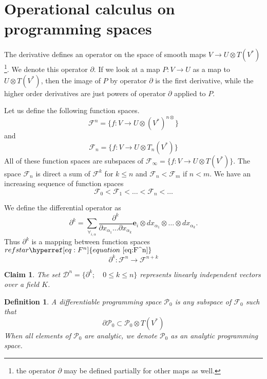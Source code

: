 \documentclass{article}
\makeatletter
\newcommand{\e}{\mathbf{e}}
\newcommand{\F}{\mathcal{F}}
\newcommand{\dP}{\mathcal{P}}
\newcommand{\D}{\partial}
\newcommand{\DD}{\mathcal{D}}
\newtheorem{definicija}{Definition}[section]
\newtheorem{trditev}{Claim}[section]
\let\originaleqref\eqref %
\renewcommand{\eqref}[1]{%
  \begingroup%
  \let\ref\@refstar%
  \hyperref[#1]{%
    equation%
    ~\originaleqref{#1}%
  }%
  \endgroup
}
\makeatother
\begin{document}
\section{Operational calculus on programming spaces}\label{sec:operational}

The derivative defines an operator on the space of smooth maps $V\to U\otimes
 T(V^*)$\footnote{the operator $\D$ may be defined partially for other maps as
   well.}. We denote this operator $\D$. If we look at a map $P:V\to U$ as a map
 to $U\otimes T(V^*)$, then the image of $P$ by operator $\D$ is the first
 derivative, while the higher order derivatives are just powers of operator $\D$
 applied to $P$. 

Let us define the following function spaces.
 \begin{equation}\label{eq:F^n}
 	\F^n=\{f:V\to U\otimes(V^*)^{n\otimes}\}
 \end{equation}
 and
 \begin{equation}\label{eq:F_n}
 	\F_n=\{f:V\to U\otimes T_n(V^*)\}
 \end{equation}
All of these function spaces are subspaces of $\F_\infty=\{f:V\to U\otimes
T(V^*)\}$. The space $\F_n$ is direct a sum of $\F^k$ for $k\le n$ and $\F_n<\F_m$ if $n<m$. We
have an increasing sequence of function spaces
\begin{equation}
  \label{eq:flag_function_space}
  \F_0<\F_1<\ldots<\F_n<\ldots
\end{equation}

We define the differential operator as
\begin{equation}\label{eq:dd}
	\partial^k=\sum_{\forall_{i,\alpha}}\frac{\partial^k}{\partial
	    x_{\alpha_1}\ldots \partial x_{\alpha_k}}\e_i\otimes
	  dx_{\alpha_1}\otimes\ldots \otimes dx_{\alpha_k}.
\end{equation}
Thus $\D^k$ is a mapping between function spaces $\eqref{eq:F^n}$
 \begin{equation}\label{eq:toFn+k}
 \D^k:\F^n\to\F^{n+k}
 \end{equation}
 
 \begin{trditev}\label{izr:linearnaNeodvisnost}
  The set $\DD^n=\{\partial^k;\quad 0\le k\le n\}$ represents linearly independent vectors over a field $K$.
 \end{trditev}
 
 \begin{definicija}\label{def:dP}
 	A \emph{differentiable programming space} $\dP_0$ is any subspace of $\F_0$ such that
 	\begin{equation}\label{eq:P}
 	\D\dP_0\subset\dP_0\otimes T(V^*)
 	\end{equation}
 	When all elements of $\dP_0$ are analytic, we denote $\dP_0$ as an \emph{analytic programming space}.
 \end{definicija}
\end{document}
